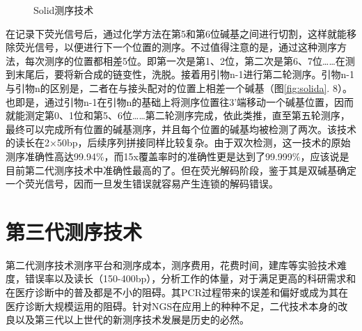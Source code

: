 \documentclass[12pt]{article} %
\begin{document}
\begin{description}
			\begin{figure}[H] %
		\caption{Solid测序技术}
		\label{fig:solidb}
	\end{figure}
	
	在记录下荧光信号后，通过化学方法在第5和第6位碱基之间进行切割，这样就能移除荧光信号，以便进行下一个位置的测序。不过值得注意的是，通过这种测序方法，每次测序的位置都相差5位。即第一次是第1、2位，第二次是第6、7位……在测到末尾后，要将新合成的链变性，洗脱。接着用引物n-1进行第二轮测序。引物n-1与引物n的区别是，二者在与接头配对的位置上相差一个碱基（图\ref{fig:solida}. 8）。也即是，通过引物n-1在引物n的基础上将测序位置往3’端移动一个碱基位置，因而就能测定第0、1位和第5、6位……第二轮测序完成，依此类推，直至第五轮测序，最终可以完成所有位置的碱基测序，并且每个位置的碱基均被检测了两次。该技术的读长在2×50bp，后续序列拼接同样比较复杂。由于双次检测，这一技术的原始测序准确性高达99.94\%，而15x覆盖率时的准确性更是达到了99.999\%，应该说是目前第二代测序技术中准确性最高的了。但在荧光解码阶段，鉴于其是双碱基确定一个荧光信号，因而一旦发生错误就容易产生连锁的解码错误。
\end{description}



\section{第三代测序技术}
第二代测序技术测序平台和测序成本，测序费用，花费时间，建库等实验技术难度，错误率以及读长（150-400bp），分析工作的体量，对于满足更高的科研需求和在医疗诊断中的普及都是不小的阻碍。其PCR过程带来的误差和偏好或成为其在医疗诊断大规模运用的阻碍。针对NGS在应用上的种种不足，二代技术本身的改良以及第三代以上世代的新测序技术发展是历史的必然。
\end{document}

